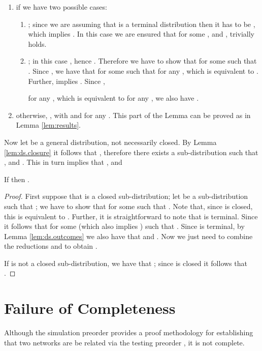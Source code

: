 \documentclass{LMCS}
\begin{document}
\begin{enumerate}
\item if  we have two 
possible cases:
\begin{enumerate}[label=(\roman*)]
\item ; since 
we are assuming that  is a 
terminal distribution then it has to be 
, which implies 
. In this case 
we are ensured that  
for some , and , 
trivially holds.
\item ; in this 
case , 
hence . Therefore we have 
to show that  for some  
such that . Since , 
we have that  for some  
such that  for any , 
which is equivalent to . 
Further,  implies . 
Since , 
 
for any , which is equivalent to 
 for any , we 
also have .
\end{enumerate}

\item otherwise, , 
 with 
 and  
for any . This part of the Lemma can be 
proved as in Lemma \ref{lem:results}.
\end{enumerate}
Now let  be a general distribution, 
not necessarily closed. 
By Lemma \ref{lem:ds.closure} it follows that 
, 
therefore there exists a sub-distribution 
 such that , and . This in turn 
implies that , and 



\begin{cor}
\label{cor:ds.outcomes}
If  then 
. 
\end{cor}
\begin{proof}
First suppose that  is a closed sub-distribution; 
let  be a sub-distribution such that 
; we have to show that 
 for some  such that 
.
Note that, since  is 
closed, this is equivalent to . 
Further, it is straightforward to note that  is 
terminal. Since  it follows 
that  for some  
(which also implies )
such that . 
Since  is terminal, by Lemma 
\ref{lem:ds.outcomes} we also have that 
 and . Now we just need to combine the 
reductions  and 
 to obtain .

If  is not a closed sub-distribution, we have 
that ; 
since  is closed it follows that 
.
\end{proof}


\section{Failure of Completeness}
\label{sec:completeness}

Although the simulation preorder  provides a proof
methodology for establishing 
 that two networks are be related via
the testing preorder , it is not complete.
 
\end{document}
